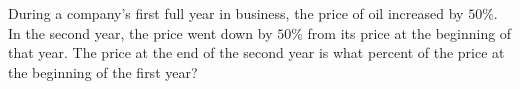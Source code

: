 During a company's first full year in business, the price of oil increased by $50\%$. In the second year, the price went down by $50\%$ from its price at the beginning of that year. The price at the end of the second year is what percent of the price at the beginning of the first year?
